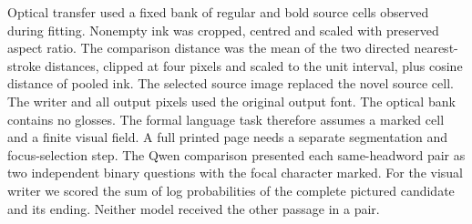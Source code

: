 Optical transfer used a fixed bank of regular and bold source cells observed during fitting. Nonempty ink was cropped, centred and scaled with preserved aspect ratio. The comparison distance was the mean of the two directed nearest-stroke distances, clipped at four pixels and scaled to the unit interval, plus cosine distance of pooled ink. The selected source image replaced the novel source cell. The writer and all output pixels used the original output font. The optical bank contains no glosses. The formal language task therefore assumes a marked cell and a finite visual field. A full printed page needs a separate segmentation and focus-selection step. The Qwen comparison presented each same-headword pair as two independent binary questions with the focal character marked. For the visual writer we scored the sum of log probabilities of the complete pictured candidate and its ending. Neither model received the other passage in a pair.
